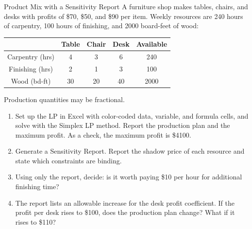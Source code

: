 \begin{ex}{Product Mix with a Sensitivity Report}{}
\label{ex:excel-furniture-sensitivity}
 A furniture shop makes tables, chairs, and desks with profits of \$70, \$50, and \$90 per item.  Weekly resources are 240 hours of carpentry, 100 hours of finishing, and 2000 board-feet of wood:

\begin{center}
\begin{tabular}{c|c|c|c|c}
 & \textbf{Table} & \textbf{Chair} & \textbf{Desk} & \textbf{Available} \\
\hline
Carpentry (hrs) & 4 & 3 & 6 & 240 \\
Finishing (hrs) & 2 & 1 & 3 & 100 \\
Wood (bd-ft) & 30 & 20 & 40 & 2000 \\
\end{tabular}
\par{}\label{tab:software-excel-tab04}%

\end{center}

Production quantities may be fractional.
\begin{enumerate}
\item Set up the LP in Excel with color-coded data, variable, and formula cells, and solve with the Simplex LP method.  Report the production plan and the maximum profit.  As a check, the maximum profit is \$4100.
\item Generate a Sensitivity Report.  Report the shadow price of each resource and state which constraints are binding.
\item Using only the report, decide: is it worth paying \$10 per hour for additional finishing time?
\item The report lists an allowable increase for the desk profit coefficient.  If the profit per desk rises to \$100, does the production plan change?  What if it rises to \$110?
\end{enumerate}
\exrefs{\S\ref{sec:excel-solver}}
\end{ex}

